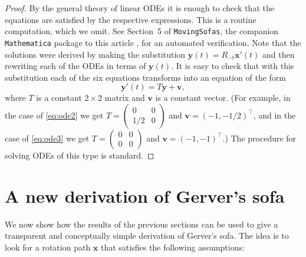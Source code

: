 \documentclass[11pt]{article}
\newcommand{\rotmat}[1]{R_{#1}}
\begin{document}
\begin{proof} 
By the general theory of linear ODEs it is enough to check that the equations are satisfied by the respective expressions. This is a routine computation, which we omit. See Section~5 of \texttt{MovingSofas}, the companion \texttt{Mathematica} package to this article \cite{romik-sofa-mathematica}, for an automated verification. Note that the solutions were derived by making the substitution $\mathbf{y}(t)=
\rotmat{-t}
\mathbf{x}'(t)$ and then rewriting each of the ODEs in terms of $\mathbf{y}(t)$. It is easy to check that with this substitution each of the six equations transforms into an equation of the form
$$
\mathbf{y}'(t) = T \mathbf{y} + \mathbf{v},
$$
where $T$ is a constant $2\times 2$ matrix and $\mathbf{v}$ is a constant vector. (For example, in the case of \eqref{eq:ode2} we get $T=\left(\begin{smallmatrix}0&0\\1/2&0 \end{smallmatrix}\right)$ and $\mathbf{v}=(-1,-1/2)^\top$, and in the case of \eqref{eq:ode3} 
we get $T=\left(\begin{smallmatrix}0&0\\0&0 \end{smallmatrix}\right)$ and $\mathbf{v}=(-1,-1)^\top$.)
The procedure for solving ODEs of this type is standard. 
\end{proof}

\section{A new derivation of Gerver's sofa}

\label{sec:gerver-rederivation}


We now show how the results of the previous sections can be used to give a transparent and conceptually simple derivation of Gerver's sofa. 
The idea is to look for a rotation path $\mathbf{x}$ that satisfies the following assumptions:
\end{document}
